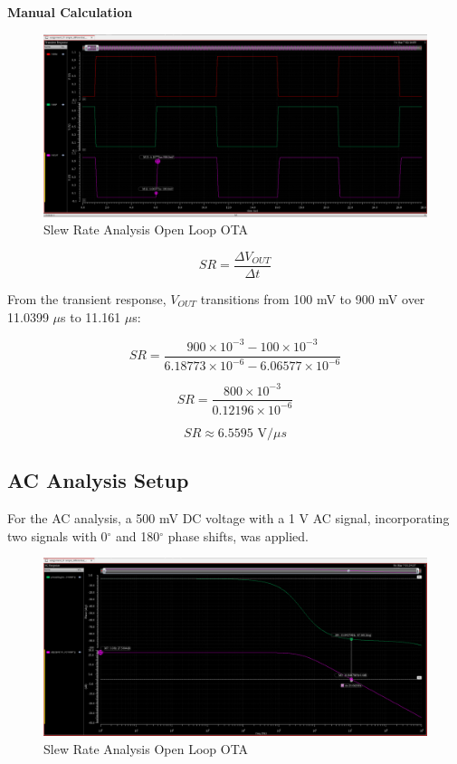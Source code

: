 \textbf{Manual Calculation}


    \begin{figure}[h]
        \centering
           \includegraphics[width=1\textwidth]{images/single_ota_slew.png}
        \caption{Slew Rate Analysis Open Loop OTA}
        \label{fig: }
    \end{figure}

\begin{equation}
    SR = \frac{\Delta V_{OUT}}{\Delta t}
\end{equation}

From the transient response, $V_{OUT}$ transitions from 100 mV to 900 mV over 11.0399 $\mu$s to 11.161 $\mu$s:

\begin{equation}
    SR = \frac{900 \times 10^{-3} - 100 \times 10^{-3}}{6.18773 \times 10^{-6} - 6.06577 \times 10^{-6}}
\end{equation}

\begin{equation}
    SR = \frac{800 \times 10^{-3}}{0.12196 \times 10^{-6}}
\end{equation}

\begin{equation}
    SR \approx 6.5595 \text{ V/} \mu s
\end{equation}


\subsection{AC Analysis Setup}
For the AC analysis, a 500 mV DC voltage with a 1 V AC signal, incorporating two signals with 0$^\circ$ and 180$^\circ$ phase shifts, was applied.


    \begin{figure}[h]
        \centering
           \includegraphics[width=1\textwidth]{images/single_ota_ac.png}
        \caption{Slew Rate Analysis Open Loop OTA}
        \label{fig: }
    \end{figure}

